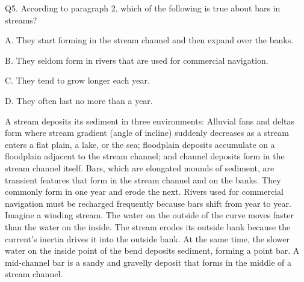 \begin{blk}
    \begin{qst}
        Q5. According to paragraph 2, which of the following is true about bars in streams?
    \end{qst}

    \begin{chc}
        A. They start forming in the stream channel and then expand over the banks.

        B. They seldom form in rivers that are used for commercial navigation.

        C. They tend to grow longer each year.

        D. They often last no more than a year.
    \end{chc}

    \begin{psgq}
        A stream deposits its sediment in three environments: Alluvial fans and deltas form where stream gradient (angle of incline) suddenly decreases as a stream enters a flat plain, a lake, or the sea; floodplain deposits accumulate on a floodplain adjacent to the stream channel; and channel deposits form in the stream channel itself. Bars, which are elongated mounds of sediment, are transient features that form in the stream channel and on the banks. They commonly form in one year and erode the next. Rivers used for commercial navigation must be recharged frequently because bars shift from year to year. Imagine a winding stream. The water on the outside of the curve moves faster than the water on the inside. The stream erodes its outside bank because the current’s inertia drives it into the outside bank. At the same time, the slower water on the inside point of the bend deposits sediment, forming a point bar. A mid-channel bar is a sandy and gravelly deposit that forms in the middle of a stream channel.
    \end{psgq}


\end{blk}
